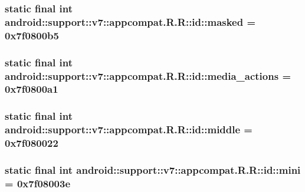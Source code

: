\hypertarget{classandroid_1_1support_1_1v7_1_1appcompat_1_1_r_1_1id_f1632ca9d83f0e77358c294c2e23242b}{
\subsubsection[{masked}]{\setlength{\rightskip}{0pt plus 5cm}static final int android::support::v7::appcompat.R.R::id::masked = 0x7f0800b5}}
\label{classandroid_1_1support_1_1v7_1_1appcompat_1_1_r_1_1id_f1632ca9d83f0e77358c294c2e23242b}


\hypertarget{classandroid_1_1support_1_1v7_1_1appcompat_1_1_r_1_1id_a746d2fa6563a7c1ac52f59881340a6e}{
\subsubsection[{media\_\-actions}]{\setlength{\rightskip}{0pt plus 5cm}static final int android::support::v7::appcompat.R.R::id::media\_\-actions = 0x7f0800a1}}
\label{classandroid_1_1support_1_1v7_1_1appcompat_1_1_r_1_1id_a746d2fa6563a7c1ac52f59881340a6e}


\hypertarget{classandroid_1_1support_1_1v7_1_1appcompat_1_1_r_1_1id_0bad0716050f59ee80e191b2026368bf}{
\subsubsection[{middle}]{\setlength{\rightskip}{0pt plus 5cm}static final int android::support::v7::appcompat.R.R::id::middle = 0x7f080022}}
\label{classandroid_1_1support_1_1v7_1_1appcompat_1_1_r_1_1id_0bad0716050f59ee80e191b2026368bf}


\hypertarget{classandroid_1_1support_1_1v7_1_1appcompat_1_1_r_1_1id_ffdee984ddee3864c56957a3a4403591}{
\subsubsection[{mini}]{\setlength{\rightskip}{0pt plus 5cm}static final int android::support::v7::appcompat.R.R::id::mini = 0x7f08003e}}
\label{classandroid_1_1support_1_1v7_1_1appcompat_1_1_r_1_1id_ffdee984ddee3864c56957a3a4403591}


